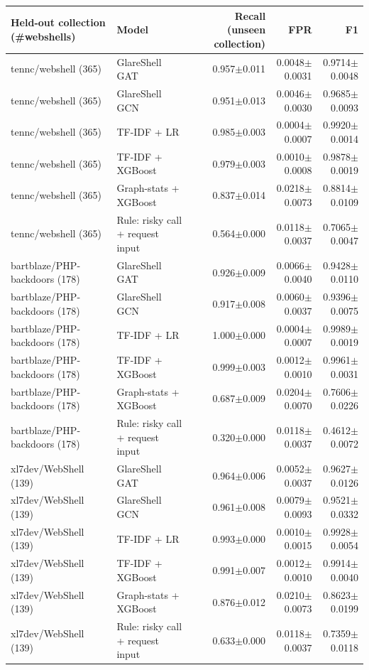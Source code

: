 \begin{tabular}{@{}llrrr@{}}
\toprule
Held-out collection (\#webshells) & Model & Recall (unseen collection) & FPR & F1 \\ \midrule
tennc/webshell (365) & GlareShell GAT & 0.957$\pm$0.011 & 0.0048$\pm$0.0031 & 0.9714$\pm$0.0048 \\
tennc/webshell (365) & GlareShell GCN & 0.951$\pm$0.013 & 0.0046$\pm$0.0030 & 0.9685$\pm$0.0093 \\
tennc/webshell (365) & TF-IDF + LR & 0.985$\pm$0.003 & 0.0004$\pm$0.0007 & 0.9920$\pm$0.0014 \\
tennc/webshell (365) & TF-IDF + XGBoost & 0.979$\pm$0.003 & 0.0010$\pm$0.0008 & 0.9878$\pm$0.0019 \\
tennc/webshell (365) & Graph-stats + XGBoost & 0.837$\pm$0.014 & 0.0218$\pm$0.0073 & 0.8814$\pm$0.0109 \\
tennc/webshell (365) & Rule: risky call + request input & 0.564$\pm$0.000 & 0.0118$\pm$0.0037 & 0.7065$\pm$0.0047 \\
bartblaze/PHP-backdoors (178) & GlareShell GAT & 0.926$\pm$0.009 & 0.0066$\pm$0.0040 & 0.9428$\pm$0.0110 \\
bartblaze/PHP-backdoors (178) & GlareShell GCN & 0.917$\pm$0.008 & 0.0060$\pm$0.0037 & 0.9396$\pm$0.0075 \\
bartblaze/PHP-backdoors (178) & TF-IDF + LR & 1.000$\pm$0.000 & 0.0004$\pm$0.0007 & 0.9989$\pm$0.0019 \\
bartblaze/PHP-backdoors (178) & TF-IDF + XGBoost & 0.999$\pm$0.003 & 0.0012$\pm$0.0010 & 0.9961$\pm$0.0031 \\
bartblaze/PHP-backdoors (178) & Graph-stats + XGBoost & 0.687$\pm$0.009 & 0.0204$\pm$0.0070 & 0.7606$\pm$0.0226 \\
bartblaze/PHP-backdoors (178) & Rule: risky call + request input & 0.320$\pm$0.000 & 0.0118$\pm$0.0037 & 0.4612$\pm$0.0072 \\
xl7dev/WebShell (139) & GlareShell GAT & 0.964$\pm$0.006 & 0.0052$\pm$0.0037 & 0.9627$\pm$0.0126 \\
xl7dev/WebShell (139) & GlareShell GCN & 0.961$\pm$0.008 & 0.0079$\pm$0.0093 & 0.9521$\pm$0.0332 \\
xl7dev/WebShell (139) & TF-IDF + LR & 0.993$\pm$0.000 & 0.0010$\pm$0.0015 & 0.9928$\pm$0.0054 \\
xl7dev/WebShell (139) & TF-IDF + XGBoost & 0.991$\pm$0.007 & 0.0012$\pm$0.0010 & 0.9914$\pm$0.0040 \\
xl7dev/WebShell (139) & Graph-stats + XGBoost & 0.876$\pm$0.012 & 0.0210$\pm$0.0073 & 0.8623$\pm$0.0199 \\
xl7dev/WebShell (139) & Rule: risky call + request input & 0.633$\pm$0.000 & 0.0118$\pm$0.0037 & 0.7359$\pm$0.0118 \\
\bottomrule
\end{tabular}

